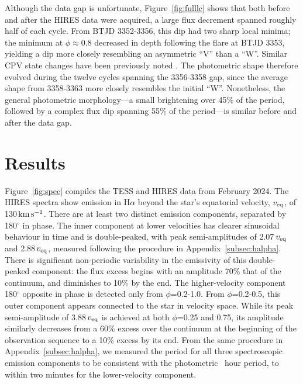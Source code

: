\documentclass[11pt,twocolumn,tighten,linenumbers]{aastex7}
\newcommand{\kms}{\ensuremath{\rm km\,s^{-1}}}
\begin{document}
Although the data gap is unfortunate, Figure~\ref{fig:fulllc} shows that
both before and after the HIRES data were acquired, a large flux
decrement spanned roughly half of each cycle.  From BTJD 3352-3356, this
dip had two sharp local minima;  the minimum at $\phi$$\approx$0.8
decreased in depth following the flare at BTJD 3353, yielding a dip more
closely resembling an asymmetric ``V'' than a ``W''.  Similar CPV state
changes have been previously noted \citep{Stauffer2017,Bouma2024}.  The
photometric shape therefore evolved during the twelve cycles spanning
the 3356-3358 gap, since the average shape from 3358-3363 more closely
resembles the initial ``W''.  Nonetheless, the general photometric
morphology---a small brightening over 45\% of the period, followed by a
complex flux dip spanning 55\% of the period---is similar before and
after the data gap.


\section{Results}
\label{sec:results}



Figure~\ref{fig:spec} compiles the TESS and HIRES data from February
2024.  The HIRES spectra show emission in H$\alpha$ beyond the star's
equatorial velocity, $v_{\rm eq}$, of 130\,\kms.  There are at least
two distinct emission components, separated by 180$^\circ$ in phase.
The inner component at lower velocities has clearer sinusoidal
behaviour in time and is double-peaked, with peak semi-amplitudes of
2.07\,$v_{\rm eq}$ and 2.88\,$v_{\rm eq}$, measured following the
procedure in Appendix~\ref{subsec:halpha}.  There is significant
non-periodic variability in the emissivity of this double-peaked
component: the flux excess begins with an amplitude 70\% that of the
continuum, and diminishes to 10\% by the end.  The higher-velocity
component 180$^\circ$ opposite in phase is detected only from
$\phi$=0.2-1.0.  From $\phi$=0.2-0.5, this outer component appears
connected to the star in velocity space.  While its peak
semi-amplitude of 3.88\,$v_{\rm eq}$ is achieved at both $\phi$=0.25
and 0.75, its amplitude similarly decreases from a 60\% excess over
the continuum at the beginning of the observation sequence to a 10\%
excess by its end.  
From the same procedure in Appendix~\ref{subsec:halpha},
we measured
the period for all three spectroscopic
emission components to be consistent with the photometric \periodhr\ hour
period, to within two minutes for the lower-velocity component.  
\end{document}
